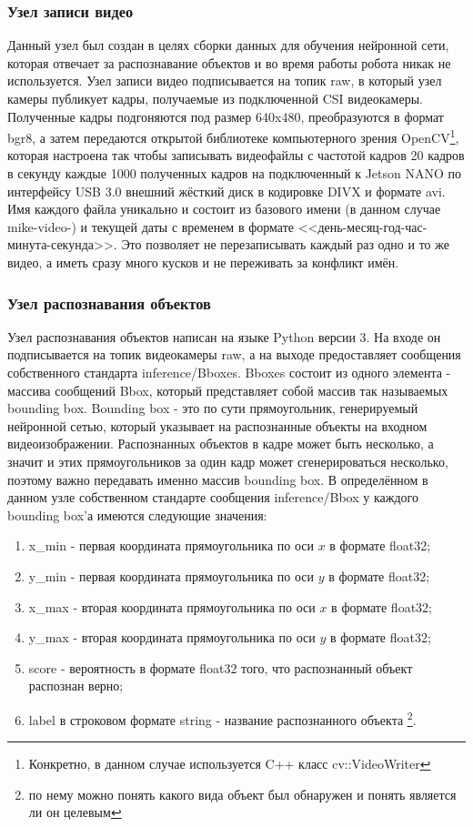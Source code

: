 \subsubsection{Узел записи видео}
Данный узел был создан в целях сборки данных для обучения нейронной сети, которая отвечает за распознавание объектов и во время работы робота никак не используется. Узел записи видео подписывается на топик raw, в который узел камеры публикует кадры, получаемые из подключенной CSI видеокамеры. Полученные кадры подгоняются под размер 640x480, преобразуются в формат bgr8, а затем передаются открытой библиотеке компьютерного зрения OpenCV\footnote{Конкретно, в данном случае используется C++ класс cv::VideoWriter}, которая настроена так чтобы записывать видеофайлы с частотой кадров 20 кадров в секунду каждые 1000 полученных кадров на подключенный к Jetson NANO по интерфейсу USB 3.0 внешний жёсткий диск в кодировке DIVX и формате avi. Имя каждого файла уникально и состоит из базового имени (в данном случае mike-video-) и текущей даты с временем в формате <<день-месяц-год-час-минута-секунда>>. Это позволяет не перезаписывать каждый раз одно и то же видео, а иметь сразу много кусков и не переживать за конфликт имён.

\subsubsection{Узел распознавания объектов}
Узел распознавания объектов написан на языке Python версии 3. На входе он подписывается на топик видеокамеры raw, а на выходе предоставляет сообщения собственного стандарта inference/Bboxes. Bboxes состоит из одного элемента - массива сообщений Bbox, который представляет собой массив так называемых bounding box. Bounding box - это по сути прямоугольник, генерируемый нейронной сетью, который указывает на распознанные объекты на входном видеоизображении. Распознанных объектов в кадре может быть несколько, а значит и этих прямоугольников за один кадр может сгенерироваться несколько, поэтому важно передавать именно массив bounding box. В определённом в данном узле собственном стандарте сообщения inference/Bbox у каждого bounding box'а имеются следующие значения:

\begin{enumerate}
\item x\_min - первая координата прямоугольника по оси $x$ в формате float32;
\item y\_min - первая координата прямоугольника по оси $y$ в формате float32;
\item x\_max - вторая координата прямоугольника по оси $x$ в формате float32;
\item y\_max - вторая координата прямоугольника по оси $y$ в формате float32;
\item score - вероятность в формате float32 того, что распознанный объект распознан верно;
\item label в строковом формате string - название распознанного объекта \footnote{по нему можно понять какого вида объект был обнаружен и понять является ли он целевым}.
\end{enumerate}

